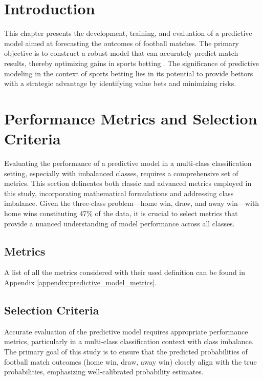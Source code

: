 \section{Introduction}
\label{sec:chapter4_intro}

This chapter presents the development, training, and evaluation of a predictive model aimed at forecasting the outcomes of football matches. The primary objective is to construct a robust model that can accurately predict match results, thereby optimizing gains in sports betting \cite{BaioBlangiardo2010} \cite{DixonColes1997}. The significance of predictive modeling in the context of sports betting lies in its potential to provide bettors with a strategic advantage by identifying value bets and minimizing risks.

\section{Performance Metrics and Selection Criteria}
\label{sec:performance_metrics}

Evaluating the performance of a predictive model in a multi-class classification setting, especially with imbalanced classes, requires a comprehensive set of metrics. This section delineates both classic and advanced metrics employed in this study, incorporating mathematical formulations and addressing class imbalance. Given the three-class problem—home win, draw, and away win—with home wins constituting 47\% of the data, it is crucial to select metrics that provide a nuanced understanding of model performance across all classes.

\subsection{Metrics}
\label{subsec:classic_metrics}

A list of all the metrics considered with their used definition can  be found in Appendix \ref{appendix:predictive_model_metrics}.

\subsection{Selection Criteria}
\label{subsec:selection_criteria}

Accurate evaluation of the predictive model requires appropriate performance metrics, particularly in a multi-class classification context with class imbalance. The primary goal of this study is to ensure that the predicted probabilities of football match outcomes (home win, draw, away win) closely align with the true probabilities, emphasizing well-calibrated probability estimates.

